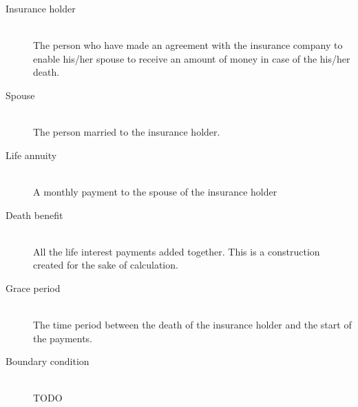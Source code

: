 \begin{description}
	\item[Insurance holder] \hfill \\
	The person who have made an agreement with the insurance company to enable his/her spouse to receive an amount of money in case of the his/her death.
	\item[Spouse] \hfill \\
	The person married to the insurance holder.
	\item[Life annuity] \hfill \\
	A monthly payment to the spouse of the insurance holder
	\item[Death benefit] \hfill \\
	All the life interest payments added together. This is a construction created for the sake of calculation. 
	\item[Grace period] \hfill \\
	The time period between the death of the insurance holder and the start of the payments. 
	\item[Boundary condition] \hfill \\
	TODO
\end{description}

